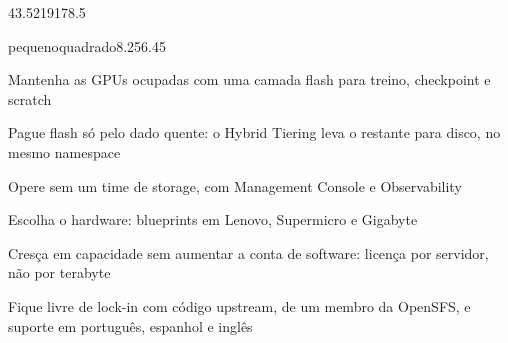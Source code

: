 \begin{pagina}

  \begin{coluna}{43.5}{219}{178.5}
    \begin{lista}{pequeno}{quadrado}{8.25}{6.45}
      \item Mantenha as GPUs ocupadas com uma camada flash para treino, checkpoint e scratch
      \item Pague flash só pelo dado quente: o Hybrid Tiering leva o restante para disco, no mesmo namespace
      \item Opere sem um time de storage, com Management Console e Observability
      \item Escolha o hardware: blueprints em Lenovo, Supermicro e Gigabyte
      \item Cresça em capacidade sem aumentar a conta de software: licença por servidor, não por terabyte
      \item Fique livre de lock-in com código upstream, de um membro da OpenSFS, e suporte em português, espanhol e inglês
    \end{lista}
  \end{coluna}


\end{pagina}
